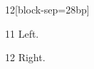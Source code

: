 \documentclass[paper=A4]{ropas-poster}
\begin{document}
\begin{postergrid}{1}{2}[block-sep=28bp]
\begin{posterblock}{1}{1}
Left.
\end{posterblock}
\begin{posterblock}{1}{2}
Right.
\end{posterblock}
\end{postergrid}
\end{document}
